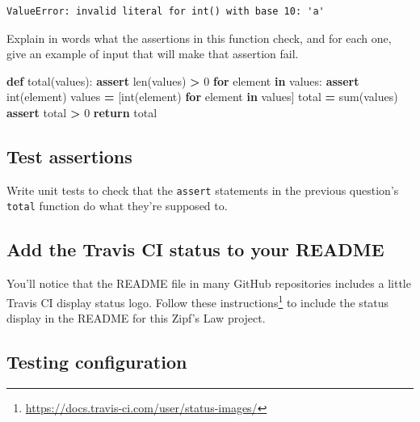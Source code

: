 \documentclass[
]{krantz}
\makeatletter
\newenvironment{Shaded}{\begin{snugshade}}{\end{snugshade}}
\newcommand{\BuiltInTok}[1]{#1}
\newcommand{\ControlFlowTok}[1]{\textcolor[rgb]{0.13,0.29,0.53}{\textbf{#1}}}
\newcommand{\DecValTok}[1]{\textcolor[rgb]{0.00,0.00,0.81}{#1}}
\newcommand{\KeywordTok}[1]{\textcolor[rgb]{0.13,0.29,0.53}{\textbf{#1}}}
\newcommand{\NormalTok}[1]{#1}
\newcommand{\OperatorTok}[1]{\textcolor[rgb]{0.81,0.36,0.00}{\textbf{#1}}}
\renewcommand{\href}[2]{#2\footnote{\url{#1}}}
\newenvironment{kframe}{%
\medskip{}
\setlength{\fboxsep}{.8em}
 \def\at@end@of@kframe{}%
 \ifinner\ifhmode%
  \def\at@end@of@kframe{\end{minipage}}%
  \begin{minipage}{\columnwidth}%
 \fi\fi%
 \def\FrameCommand##1{\hskip\@totalleftmargin \hskip-\fboxsep
 \colorbox{shadecolor}{##1}\hskip-\fboxsep
     \hskip-\linewidth \hskip-\@totalleftmargin \hskip\columnwidth}%
 \MakeFramed {\advance\hsize-\width
   \@totalleftmargin\z@ \linewidth\hsize
   \@setminipage}}%
 {\par\unskip\endMakeFramed%
 \at@end@of@kframe}
\renewenvironment{Shaded}{\begin{kframe}}{\end{kframe}}
\makeatother
\begin{document}
\begin{verbatim}
ValueError: invalid literal for int() with base 10: 'a'
\end{verbatim}

Explain in words what the assertions in this function check,
and for each one,
give an example of input that will make that assertion fail.

\begin{Shaded}
\begin{Highlighting}[]
\KeywordTok{def}\NormalTok{ total(values):}
    \ControlFlowTok{assert} \BuiltInTok{len}\NormalTok{(values) }\OperatorTok{\textgreater{}} \DecValTok{0}
    \ControlFlowTok{for}\NormalTok{ element }\KeywordTok{in}\NormalTok{ values:}
        \ControlFlowTok{assert} \BuiltInTok{int}\NormalTok{(element)}
\NormalTok{    values }\OperatorTok{=}\NormalTok{ [}\BuiltInTok{int}\NormalTok{(element) }\ControlFlowTok{for}\NormalTok{ element }\KeywordTok{in}\NormalTok{ values]}
\NormalTok{    total }\OperatorTok{=} \BuiltInTok{sum}\NormalTok{(values)}
    \ControlFlowTok{assert}\NormalTok{ total }\OperatorTok{\textgreater{}} \DecValTok{0}
    \ControlFlowTok{return}\NormalTok{ total}
\end{Highlighting}
\end{Shaded}

\hypertarget{testing-ex-test-assert}{%
\subsection{Test assertions}\label{testing-ex-test-assert}}

Write unit tests to check that the \texttt{assert} statements in the previous question's \texttt{total} function
do what they're supposed to.

\hypertarget{testing-ex-ci-status-readme}{%
\subsection{Add the Travis CI status to your README}\label{testing-ex-ci-status-readme}}

You'll notice that the README file in many GitHub repositories includes a little
Travis CI display status logo.
Follow \href{https://docs.travis-ci.com/user/status-images/}{these instructions} to include
the status display in the README for this Zipf's Law project.

\hypertarget{testing-ex-config}{%
\subsection{Testing configuration}\label{testing-ex-config}}
\end{document}

